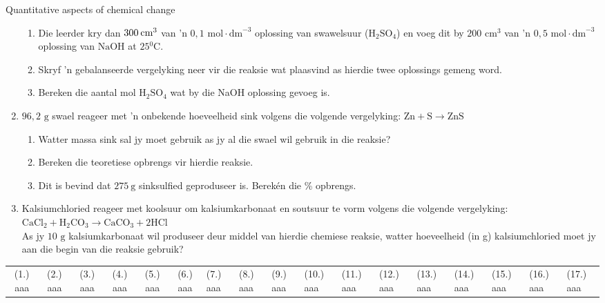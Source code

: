 \begin{eocexercises}{Quantitative aspects of chemical change}
\begin{enumerate}[noitemsep, label=\textbf{\arabic*}. ]
\begin{enumerate}[noitemsep, label=\textbf{\alph*}. ]
 \item Die leerder kry dan $300\phantom{\rule{2pt}{0ex}}{\text{cm}}^{3}$ van 'n $0,1 \text{ mol} \cdot {\text{dm}}^{-3}$ oplossing van swawelsuur ($\text{H}{}_{2}\text{SO}{}_{4}$) en voeg dit by $200 {\text{ cm}}^{3}$ van 'n $0,5 \text{ mol} \cdot {\text{dm}}^{-3}$ oplossing van $\text{NaOH}$ at $25{}^{0}\text{C}$.
 \item Skryf 'n gebalanseerde vergelyking neer vir die reaksie wat plaasvind as hierdie twee oplossings gemeng word.
 \item Bereken die aantal mol $\text{H}{}_{2}\text{SO}{}_{4}$ wat by die NaOH oplossing gevoeg is.
\end{enumerate}
\item $96,2 \text{ g}$ swael reageer met 'n onbekende hoeveelheid sink volgens die volgende vergelyking: 
$\text{Zn}+\text{S}\to \text{ZnS}$
 \begin{enumerate}[noitemsep, label=\textbf{\alph*}. ] 
 \item Watter massa sink sal jy moet gebruik as jy al die swael wil gebruik in die reaksie?
 \item Bereken die teoretiese opbrengs vir hierdie reaksie.
 \item Dit is bevind dat $275~\text{g}$ sinksulfied geproduseer is. Berekén die \% opbrengs.
 \end{enumerate}
\item Kalsiumchloried reageer met koolsuur om kalsiumkarbonaat en soutsuur te vorm volgens die volgende vergelyking:\\
${\text{CaCl}}_{2}+{\text{H}}_{2}{\text{CO}}_{3}\to {\text{CaCO}}_{3}+2\text{HCl}$\\
As jy $10 \text{ g}$ kalsiumkarbonaat wil produseer deur middel van hierdie chemiese reaksie, watter hoeveelheid (in g) kalsiumchloried moet jy aan die begin van die reaksie gebruik?
                \end{enumerate}
\practiceinfo
\par 
 \par \begin{tabular}[h]{cccccc}
 (1.) aaa  &  (2.) aaa  &  (3.) aaa  &  (4.) aaa  &  (5.) aaa  &  (6.) aaa  &  (7.) aaa  &  (8.) aaa  &  (9.) aaa  &  (10.) aaa  &  (11.) aaa  &  (12.) aaa  &  (13.) aaa  &  (14.) aaa  &  (15.) aaa  & (16.) aaa & (17.) aaa \end{tabular}
\end{eocexercises}

